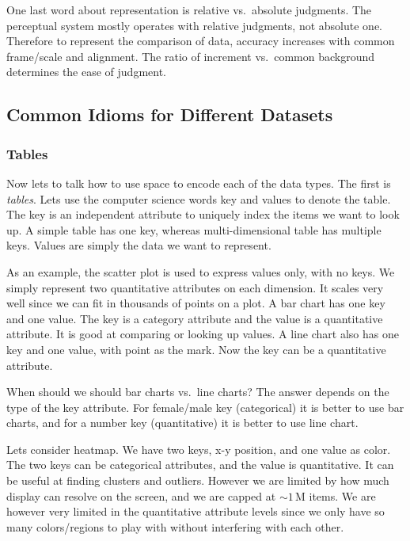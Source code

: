 \documentclass[letterpaper, 11pt]{article}
\numberwithin{equation}{section}
\numberwithin{figure}{section}
\begin{document}
One last word about representation is relative vs.\ absolute judgments.
The perceptual system mostly operates with relative judgments, not absolute one.
Therefore to represent the comparison of data, accuracy increases with common
frame/scale and alignment. The ratio of increment vs.\ common background
determines the ease of judgment.

\subsection{Common Idioms for Different Datasets}

\subsubsection{Tables}

Now lets to talk how to use space to encode each of the data types. The first is
\emph{tables}. Lets use the computer science words key and values to denote the
table. The key is an independent attribute to uniquely index the items we want
to look up. A simple table has one key, whereas multi-dimensional table has
multiple keys. Values are simply the data we want to represent.

As an example, the scatter plot is used to express values only, with no keys. We
simply represent two quantitative attributes on each dimension. It scales very
well since we can fit in thousands of points on a plot. A bar chart has one key
and one value. The key is a category attribute and the value is a quantitative
attribute. It is good at comparing or looking up values. A line chart also has
one key and one value, with point as the mark. Now the key can be a quantitative
attribute.

When should we should bar charts vs.\ line charts? The answer depends on the
type of the key attribute. For female/male key (categorical) it is better to use
bar charts, and for a number key (quantitative) it is better to use line chart.

Lets consider heatmap. We have two keys, x-y position, and one value as color.
The two keys can be categorical attributes, and the value is quantitative. It
can be useful at finding clusters and outliers. However we are limited by how
much display can resolve on the screen, and we are capped at $\sim
1\,\mathrm{M}$ items. We are however very limited in the quantitative attribute
levels since we only have so many colors/regions to play with without
interfering with each other.
\end{document}
